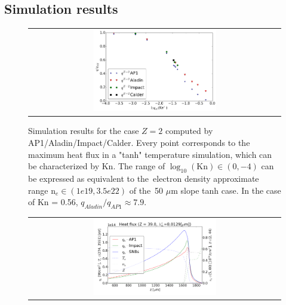 \subsection{Simulation results}
\label{sec:SimulationResults}

\begin{figure}[tbh]
  \begin{center}
    \begin{tabular}{c}
      \includegraphics[width=0.5\textwidth]{Kn_results.png}
    \end{tabular}
  \caption{  
  Simulation results for the case $Z=2$ computed by AP1/Aladin/Impact/Calder.
  Every point corresponds to the maximum heat flux in a "tanh" temperature 
  simulation, which can be characterized by Kn. The range of 
  $\log_{10}(\text{Kn})\in (0, -4)$ can be expressed as equivalent 
  to the~electron density approximate range n$_e \in (1e19, 3.5e22)$ of 
  the~50 $\mu$m slope tanh case. In the case of Kn = 0.56, 
  $q_{Aladin} / q_{AP1}\approx 7.9$.}
  \end{center}
  \label{fig:Kn_results}
\end{figure}

\begin{figure}[tbh]
  \begin{center}
    \begin{tabular}{c}
      \includegraphics[width=0.5\textwidth]{../VFPdata/GD_Hohlraum/fluxes_10ps.png} 
    \end{tabular}
  \caption{
  }
  \end{center}
  \label{fig:Gd_VFP_10ps_heatflux}
\end{figure}
